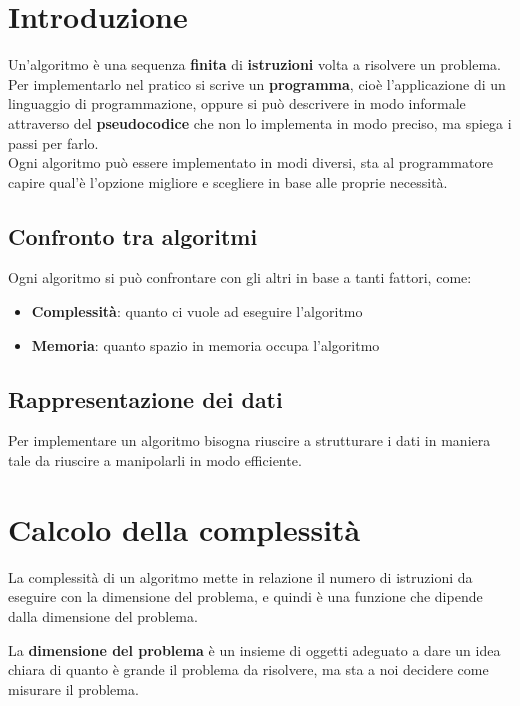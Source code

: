 \documentclass[a4paper]{article}
\theoremstyle{break}
\theoremstyle{break}
\theoremstyle{break}
\theoremstyle{break}
\begin{document}


\tableofcontents
\pagebreak

\section{Introduzione}
Un'algoritmo è una sequenza \textbf{finita} di \textbf{istruzioni} volta a risolvere un problema.
Per implementarlo nel pratico si scrive un \textbf{programma}, cioè l'applicazione di
un linguaggio di programmazione, oppure si può descrivere in modo informale
attraverso del \textbf{pseudocodice} che non lo implementa in modo preciso,
ma spiega i passi per farlo.
\\
Ogni algoritmo può essere implementato in modi diversi, sta al programmatore
capire qual'è l'opzione migliore e scegliere in base alle proprie necessità.

\subsection{Confronto tra algoritmi}
Ogni algoritmo si può confrontare con gli altri in base a tanti fattori, come:
\begin{itemize}
  \item \textbf{Complessità}: quanto ci vuole ad eseguire l'algoritmo
  \item \textbf{Memoria}: quanto spazio in memoria occupa l'algoritmo
\end{itemize}

\subsection{Rappresentazione dei dati}
Per implementare un algoritmo bisogna riuscire a strutturare i dati in maniera tale
da riuscire a manipolarli in modo efficiente.

\section{Calcolo della complessità}
La complessità di un algoritmo mette in relazione il numero di istruzioni da eseguire
con la dimensione del problema, e quindi è una funzione che dipende dalla dimensione
del problema.

\vspace{1em}
\noindent
La \textbf{dimensione del problema} è un insieme di oggetti adeguato a dare un idea
chiara di quanto è grande il problema da risolvere, ma sta a noi decidere come
misurare il problema.
\end{document}
